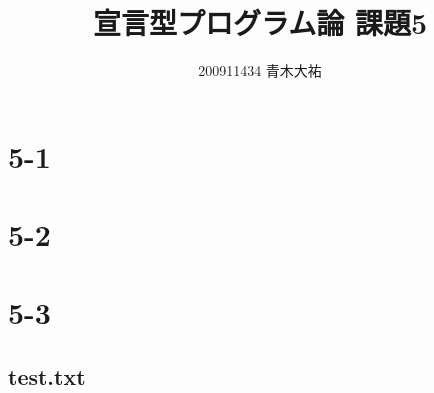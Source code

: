 \documentclass[a4paper,8pt]{jarticle}
\title{宣言型プログラム論 課題5}
\author{200911434 青木大祐}
\begin{document}
\maketitle
\newpage
\section*{5-1}

\section*{5-2}

\section*{5-3}

\subsection*{test.txt}

\end{document}
